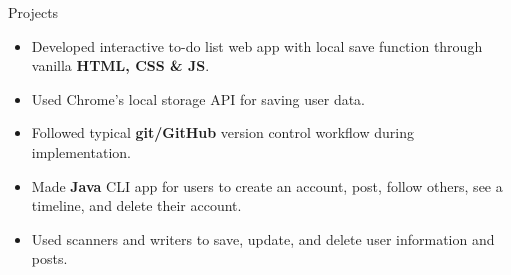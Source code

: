 \documentclass{resume} %
\begin{document}
\begin{workSection}{Projects}
\begin{itemize}
        \itemsep -6pt {}
        \item Developed interactive to-do list web app with local save function through vanilla \textbf{HTML{,} CSS \& JS}.
        \item Used Chrome's local storage API for saving user data. %
        \item Followed typical \textbf{git/GitHub} version control workflow during implementation. %
    \end{itemize}

    \customItem[
        title=\href{https://github.com/AshkanArabim/blabber}{Blabber {-} a CLI Twitter replica \faExternalLink},
        duration=Fall 2022,
    ]
    \begin{itemize}
        \vspace{-0.5em}
        \itemsep -6pt {}
        \item Made \textbf{Java} CLI app for users to create an account{,} post{,} follow others{,} see a timeline{,} and delete their account.
        \item Used scanners and writers to save{,} update{,} and delete user information and posts. %
    \end{itemize}


\end{workSection}
\end{document}
